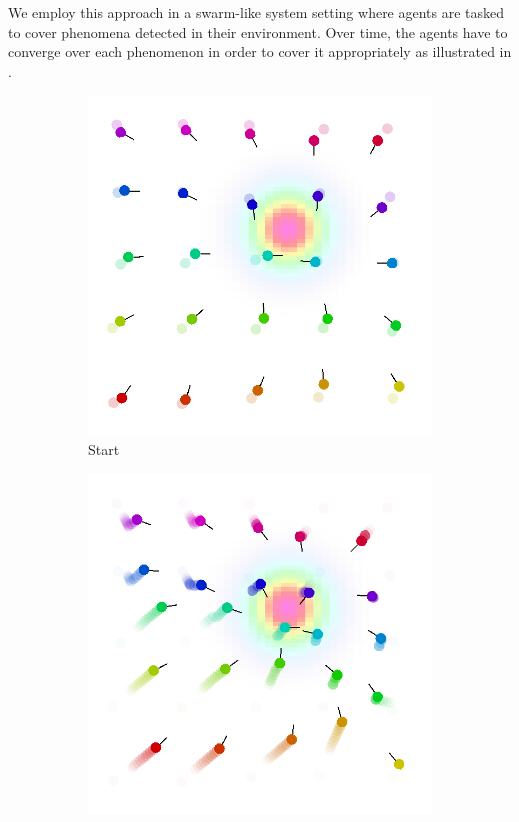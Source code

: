 We employ this approach in a swarm-like system setting where agents are tasked to cover phenomena detected in their environment. 
Over time, the agents have to converge over each phenomenon in order to cover it appropriately as illustrated in .
\begin{figure}[t]
	\centering
	\begin{subfigure}[b]{0.32\linewidth}
		\includegraphics[width=\textwidth]{papers/acsos2023/imgs/start.png}
		\caption{Start}
		\label{acsos2023:fig:initial}
	\end{subfigure}
	\begin{subfigure}[b]{0.32\linewidth}
		\includegraphics[width=\textwidth]{papers/acsos2023/imgs/after.png}

\end{subfigure}
\end{figure}
